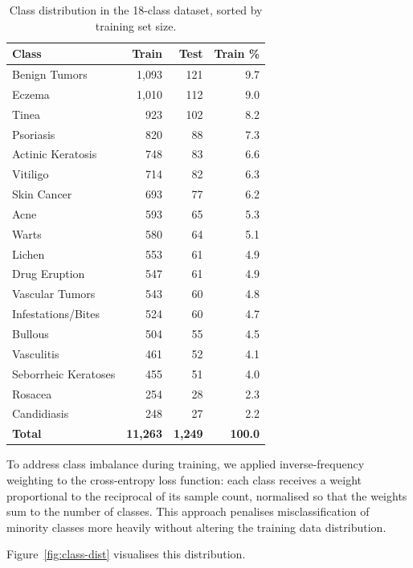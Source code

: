 \documentclass[11pt,a4paper]{article}
\begin{document}
\begin{table}[H]
\centering
\caption{Class distribution in the 18-class dataset, sorted by training set size.}
\label{tab:class-dist}
\small
\begin{tabular}{lrrr}
\toprule
\textbf{Class} & \textbf{Train} & \textbf{Test} & \textbf{Train \%} \\
\midrule
Benign Tumors       & 1,093 & 121 & 9.7 \\
Eczema              & 1,010 & 112 & 9.0 \\
Tinea               &   923 & 102 & 8.2 \\
Psoriasis           &   820 &  88 & 7.3 \\
Actinic Keratosis   &   748 &  83 & 6.6 \\
Vitiligo            &   714 &  82 & 6.3 \\
Skin Cancer         &   693 &  77 & 6.2 \\
Acne                &   593 &  65 & 5.3 \\
Warts               &   580 &  64 & 5.1 \\
Lichen              &   553 &  61 & 4.9 \\
Drug Eruption       &   547 &  61 & 4.9 \\
Vascular Tumors     &   543 &  60 & 4.8 \\
Infestations/Bites  &   524 &  60 & 4.7 \\
Bullous             &   504 &  55 & 4.5 \\
Vasculitis          &   461 &  52 & 4.1 \\
Seborrheic Keratoses&   455 &  51 & 4.0 \\
Rosacea             &   254 &  28 & 2.3 \\
Candidiasis         &   248 &  27 & 2.2 \\
\midrule
\textbf{Total}      & \textbf{11,263} & \textbf{1,249} & \textbf{100.0} \\
\bottomrule
\end{tabular}
\end{table}

To address class imbalance during training, we applied inverse-frequency weighting to the cross-entropy loss function: each class receives a weight proportional to the reciprocal of its sample count, normalised so that the weights sum to the number of classes. This approach penalises misclassification of minority classes more heavily without altering the training data distribution.

Figure~\ref{fig:class-dist} visualises this distribution.
\end{document}
